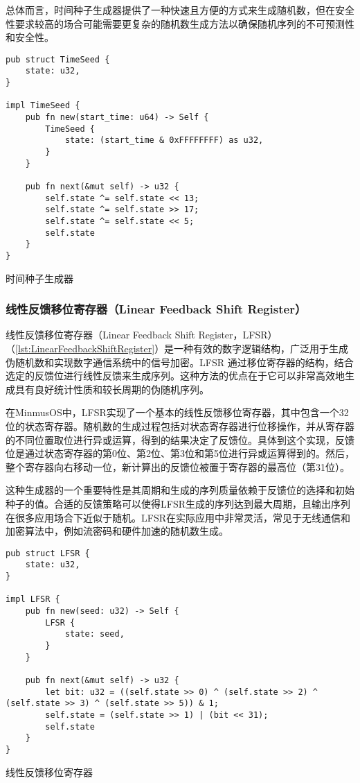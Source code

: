 总体而言，时间种子生成器提供了一种快速且方便的方式来生成随机数，但在安全性要求较高的场合可能需要更复杂的随机数生成方法以确保随机序列的不可预测性和安全性。

\begin{listing}[htbp]
    \begin{verbatim}
pub struct TimeSeed {
    state: u32,
}

impl TimeSeed {
    pub fn new(start_time: u64) -> Self {
        TimeSeed {
            state: (start_time & 0xFFFFFFFF) as u32,
        }
    }

    pub fn next(&mut self) -> u32 {
        self.state ^= self.state << 13;
        self.state ^= self.state >> 17;
        self.state ^= self.state << 5;
        self.state
    }
}
    \end{verbatim}
    \caption{时间种子生成器}\label{lst:TimeSeedGenerator}
\end{listing}

\subsubsection{线性反馈移位寄存器（Linear Feedback Shift Register）}

线性反馈移位寄存器（Linear Feedback Shift Register，LFSR）（\cref{lst:LinearFeedbackShiftRegister}）是一种有效的数字逻辑结构，广泛用于生成伪随机数和实现数字通信系统中的信号加密。LFSR 通过移位寄存器的结构，结合选定的反馈位进行线性反馈来生成序列。这种方法的优点在于它可以非常高效地生成具有良好统计性质和较长周期的伪随机序列。

在MinmusOS中，LFSR实现了一个基本的线性反馈移位寄存器，其中包含一个32位的状态寄存器。随机数的生成过程包括对状态寄存器进行位移操作，并从寄存器的不同位置取位进行异或运算，得到的结果决定了反馈位。具体到这个实现，反馈位是通过状态寄存器的第0位、第2位、第3位和第5位进行异或运算得到的。然后，整个寄存器向右移动一位，新计算出的反馈位被置于寄存器的最高位（第31位）。

这种生成器的一个重要特性是其周期和生成的序列质量依赖于反馈位的选择和初始种子的值。合适的反馈策略可以使得LFSR生成的序列达到最大周期，且输出序列在很多应用场合下近似于随机。LFSR在实际应用中非常灵活，常见于无线通信和加密算法中，例如流密码和硬件加速的随机数生成。

\begin{listing}[htbp]
    \begin{verbatim}
pub struct LFSR {
    state: u32,
}

impl LFSR {
    pub fn new(seed: u32) -> Self {
        LFSR {
            state: seed,
        }
    }

    pub fn next(&mut self) -> u32 {
        let bit: u32 = ((self.state >> 0) ^ (self.state >> 2) ^ (self.state >> 3) ^ (self.state >> 5)) & 1;
        self.state = (self.state >> 1) | (bit << 31);
        self.state
    }
}
    \end{verbatim}
    \caption{线性反馈移位寄存器}\label{lst:LinearFeedbackShiftRegister}
\end{listing}

